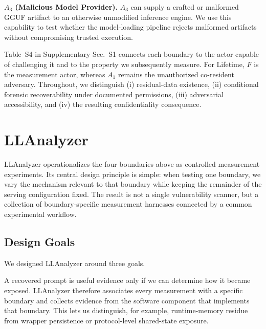 \documentclass[journal,tifs]{IEEEtran}
\begin{document}
\noindent\textbf{${A}_3$ (Malicious Model Provider).}
${A}_3$ can supply a crafted or malformed GGUF artifact to an otherwise
unmodified inference engine. We use this capability to test whether the
model-loading pipeline rejects malformed artifacts without compromising
trusted execution.

Table~S4 in Supplementary Sec.~S1 connects each boundary
to the actor capable of challenging it and to the property we subsequently
measure. For Lifetime, $F$ is the measurement actor, whereas ${A}_1$ remains
the unauthorized co-resident adversary. Throughout, we distinguish (i)
residual-data existence, (ii) conditional forensic recoverability under
documented permissions, (iii) adversarial accessibility, and (iv) the
resulting confidentiality consequence.

\section{LLAnalyzer}
\label{sec:methodology}

LLAnalyzer operationalizes the four boundaries above as controlled
measurement experiments. Its central design principle is simple: when
testing one boundary, we vary the mechanism relevant to that boundary
while keeping the remainder of the serving configuration fixed. The
result is not a single vulnerability scanner, but a collection of
boundary-specific measurement harnesses connected by a common
experimental workflow.

\subsection{Design Goals}

We designed LLAnalyzer around three goals.

A recovered prompt is useful evidence only if we can determine how it
became exposed. LLAnalyzer therefore associates every measurement with a
specific boundary and collects evidence from the software component that
implements that boundary. This lets us distinguish, for example,
runtime-memory residue from wrapper persistence or protocol-level
shared-state exposure.
\end{document}
